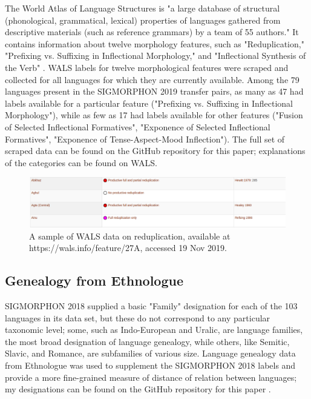 The World Atlas of Language Structures is "a large database of structural (phonological, grammatical, lexical) properties of languages gathered from descriptive materials (such as reference grammars) by a team of 55 authors." It contains information about twelve morphology features, such as "Reduplication," "Prefixing vs. Suffixing in Inflectional Morphology," and "Inflectional Synthesis of the Verb" \parencite{WALS}. WALS labels for twelve morphological features were scraped and collected for all languages for which they are currently available. Among the 79 languages present in the SIGMORPHON 2019 transfer pairs, as many as 47 had labels available for a particular feature ("Prefixing vs. Suffixing in Inflectional Morphology"), while as few as 17 had labels available for other features ("Fusion of Selected Inflectional Formatives", "Exponence of Selected Inflectional Formatives", "Exponence of Tense-Aspect-Mood Inflection"). The full set of scraped data can be found on the GitHub repository for this paper; explanations of the categories can be found on WALS. 

\begin{figure}[ht]
\includegraphics[width=13.5cm]{images/WALS.png}
\centering
\caption{A sample of WALS data on reduplication, available at https://wals.info/feature/27A, accessed 19 Nov 2019.}
\end{figure}

\subsection{Genealogy from Ethnologue}

SIGMORPHON 2018 supplied a basic "Family" designation for each of the 103 languages in its data set, but these do not correspond to any particular taxonomic level; some, such as Indo-European and Uralic, are language families, the most broad designation of language genealogy, while others, like Semitic, Slavic, and Romance, are subfamilies of various size. Language genealogy data from Ethnologue was used to supplement the SIGMORPHON 2018 labels and provide a more fine-grained measure of distance of relation between languages; my designations can be found on the GitHub repository for this paper \parencite{Ethnologue}.

